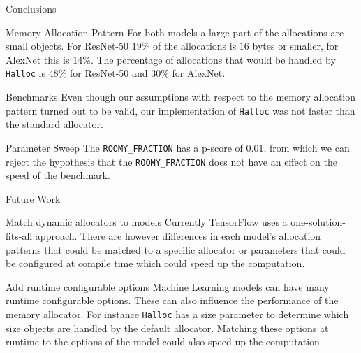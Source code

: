 \documentclass[10pt]{beamer}
\begin{document}



\begin{frame}[fragile]{Conclusions}


\begin{alertblock}{Memory Allocation Pattern}
For both models a large part of the allocations are small objects. For ResNet-50 $19\%$ of the allocations is $16$ bytes or smaller, for AlexNet this is $14\%$. The percentage of allocations that would be handled by \texttt{Halloc} is $48\%$ for ResNet-50 and $30\%$ for AlexNet.
\end{alertblock}

\begin{alertblock}{Benchmarks}
Even though our assumptions with respect to the memory allocation pattern turned out to be valid, our implementation of \texttt{Halloc} was not faster than the standard allocator.
\end{alertblock}

\begin{alertblock}{Parameter Sweep}
The \texttt{ROOMY\_FRACTION} has a p-score of $0.01$, from which we can reject the hypothesis that the \texttt{ROOMY\_FRACTION} does not have an effect on the speed of the benchmark.
\end{alertblock}

\end{frame}

\begin{frame}[fragile]{Future Work}


\begin{alertblock}{Match dynamic allocators to models}
Currently TensorFlow uses a one-solution-fits-all approach. There are however differences in each model's allocation patterns that could be matched to a specific allocator or parameters that could be configured at compile time which could speed up the computation.
\end{alertblock}

\begin{alertblock}{Add runtime configurable options}
Machine Learning models can have many runtime configurable options. These can also influence the performance of the memory allocator. For instance \texttt{Halloc} has a size parameter to determine which size objects are handled by the default allocator. Matching these options at runtime to the options of the model could also speed up the computation.
\end{alertblock}

\end{frame}
\end{document}
